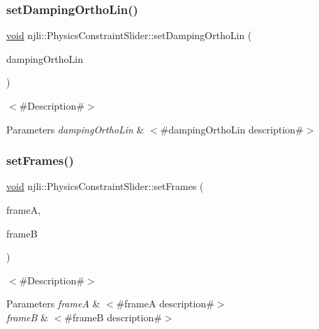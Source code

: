 \subsubsection{\texorpdfstring{set\+Damping\+Ortho\+Lin()}{setDampingOrthoLin()}}
{\footnotesize\ttfamily \mbox{\hyperlink{_thread_8h_af1e856da2e658414cb2456cb6f7ebc66}{void}} njli\+::\+Physics\+Constraint\+Slider\+::set\+Damping\+Ortho\+Lin (\begin{DoxyParamCaption}\item[{\mbox{\hyperlink{_util_8h_a5f6906312a689f27d70e9d086649d3fd}{f32}}}]{damping\+Ortho\+Lin }\end{DoxyParamCaption})}

$<$\#\+Description\#$>$


\begin{DoxyParams}{Parameters}
{\em damping\+Ortho\+Lin} & $<$\#damping\+Ortho\+Lin description\#$>$ \\
\hline
\end{DoxyParams}
\mbox{\label{classnjli_1_1_physics_constraint_slider_aa094607cc490eaf1edcf429267d76070}} 
\subsubsection{\texorpdfstring{set\+Frames()}{setFrames()}}
{\footnotesize\ttfamily \mbox{\hyperlink{_thread_8h_af1e856da2e658414cb2456cb6f7ebc66}{void}} njli\+::\+Physics\+Constraint\+Slider\+::set\+Frames (\begin{DoxyParamCaption}\item[{const bt\+Transform \&}]{frameA,  }\item[{const bt\+Transform \&}]{frameB }\end{DoxyParamCaption})}

$<$\#\+Description\#$>$


\begin{DoxyParams}{Parameters}
{\em frameA} & $<$\#frameA description\#$>$ \\
\hline
{\em frameB} & $<$\#frameB description\#$>$ \\
\hline
\end{DoxyParams}
\mbox{\label{classnjli_1_1_physics_constraint_slider_aea8072c63719f2d3be84a02b1cabb9cb}} 
